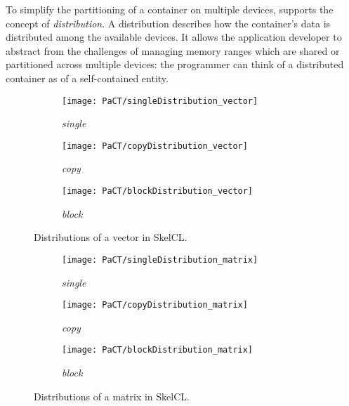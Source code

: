To simplify the partitioning of a container on multiple devices, \SkelCL supports the concept of \emph{distribution}.
A distribution describes how the container's data is distributed among the available devices.
It allows the application developer to abstract from the challenges of managing memory ranges which are shared or partitioned across multiple devices: the programmer can think of a distributed container as of a self-contained entity.



\begin{figure}[tb]
  \centering
  \begin{subfigure}{.3\textwidth}
    \texttt{[image: PaCT/singleDistribution\_vector]}
    \caption{\emph{single}}
    \label{fig:distributions:single}
  \end{subfigure}
  \hfill
  \begin{subfigure}{.3\textwidth}
    \texttt{[image: PaCT/copyDistribution\_vector]}
    \caption{\emph{copy}}
    \label{fig:distributions:copy}
  \end{subfigure}
  \hfill
  \begin{subfigure}{.3\textwidth}
    \texttt{[image: PaCT/blockDistribution\_vector]}
    \caption{\emph{block}}
    \label{fig:distributions:block}
  \end{subfigure}
  \caption{Distributions of a vector in SkelCL.}
  \label{fig:distributions}
  \bigskip
\end{figure}

\begin{figure}[tbp]
  \centering
  \begin{subfigure}{.22\textwidth}
    \texttt{[image: PaCT/singleDistribution\_matrix]}
    \caption{\emph{single}}
    \label{fig:distributions_matrix:single}
  \end{subfigure}
  \hfill
  \begin{subfigure}{.22\textwidth}
    \texttt{[image: PaCT/copyDistribution\_matrix]}
    \caption{\emph{copy}}
    \label{fig:distributions_matrix:copy}
  \end{subfigure}
  \hfill
  \begin{subfigure}{.22\textwidth}
    \texttt{[image: PaCT/blockDistribution\_matrix]}
    \caption{\emph{block}}
    \label{fig:distributions_matrix:block}
  \end{subfigure}
  \caption{Distributions of a matrix in SkelCL.}
  \label{fig:distributions_matrix}
\end{figure}


